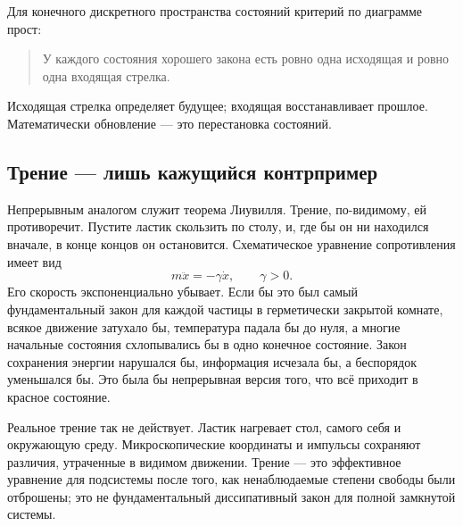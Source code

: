 Для конечного дискретного пространства состояний критерий по диаграмме прост:
\begin{quote}
У каждого состояния хорошего закона есть ровно одна исходящая и ровно одна входящая стрелка.
\end{quote}
Исходящая стрелка определяет будущее; входящая восстанавливает прошлое. Математически обновление — это перестановка состояний.

\subsection{Трение — лишь кажущийся контрпример}

Непрерывным аналогом служит теорема Лиувилля. Трение, по-видимому, ей противоречит. Пустите ластик скользить по столу, и, где бы он ни находился вначале, в конце концов он остановится. Схематическое уравнение сопротивления имеет вид
\begin{equation}
 m\ddot x=-\gamma\dot x,
 \qquad \gamma>0.
 \label{eq:sm1-drag}
\end{equation}
Его скорость экспоненциально убывает. Если бы это был самый фундаментальный закон для каждой частицы в герметически закрытой комнате, всякое движение затухало бы, температура падала бы до нуля, а многие начальные состояния схлопывались бы в одно конечное состояние. Закон сохранения энергии нарушался бы, информация исчезала бы, а беспорядок уменьшался бы. Это была бы непрерывная версия того, что всё приходит в красное состояние.

Реальное трение так не действует. Ластик нагревает стол, самого себя и окружающую среду. Микроскопические координаты и импульсы сохраняют различия, утраченные в видимом движении. Трение — это эффективное уравнение для подсистемы после того, как ненаблюдаемые степени свободы были отброшены; это не фундаментальный диссипативный закон для полной замкнутой системы.

\begin{classroomqa}
\end{classroomqa}

